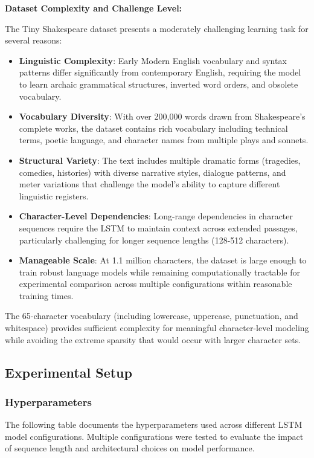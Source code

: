 \documentclass[12pt]{article}
\begin{document}
\textbf{Dataset Complexity and Challenge Level:}

The Tiny Shakespeare dataset presents a moderately challenging learning task for several reasons:

\begin{itemize}
    \item \textbf{Linguistic Complexity}: Early Modern English vocabulary and syntax patterns differ significantly from contemporary English, requiring the model to learn archaic grammatical structures, inverted word orders, and obsolete vocabulary.
    
    \item \textbf{Vocabulary Diversity}: With over 200,000 words drawn from Shakespeare's complete works, the dataset contains rich vocabulary including technical terms, poetic language, and character names from multiple plays and sonnets.
    
    \item \textbf{Structural Variety}: The text includes multiple dramatic forms (tragedies, comedies, histories) with diverse narrative styles, dialogue patterns, and meter variations that challenge the model's ability to capture different linguistic registers.
    
    \item \textbf{Character-Level Dependencies}: Long-range dependencies in character sequences require the LSTM to maintain context across extended passages, particularly challenging for longer sequence lengths (128-512 characters).
    
    \item \textbf{Manageable Scale}: At 1.1 million characters, the dataset is large enough to train robust language models while remaining computationally tractable for experimental comparison across multiple configurations within reasonable training times.
\end{itemize}

The 65-character vocabulary (including lowercase, uppercase, punctuation, and whitespace) provides sufficient complexity for meaningful character-level modeling while avoiding the extreme sparsity that would occur with larger character sets.

\subsection{Experimental Setup}
\label{subsec:setup}

\subsubsection{Hyperparameters}
The following table documents the hyperparameters used across different LSTM model configurations. Multiple configurations were tested to evaluate the impact of sequence length and architectural choices on model performance.
\end{document}
